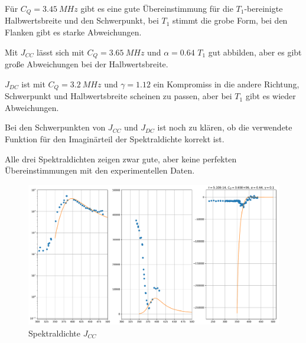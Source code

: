 Für $C_Q = \SI{3.45}{MHz}$ gibt es eine gute Übereinstimmung für die $T_1$-bereinigte Halbwertsbreite und den Schwerpunkt, bei $T_1$ stimmt die grobe Form, bei den Flanken gibt es starke Abweichungen.

Mit $J_{CC}$ lässt sich mit $C_Q = \SI{3.65}{MHz}$ und $\alpha = 0.64$ $T_1$ gut abbilden, aber es gibt große Abweichungen bei der Halbwertsbreite. 

$J_{DC}$ ist mit $C_Q = \SI{3.2}{MHz}$ und $\gamma = 1.12$ ein Kompromiss in die andere Richtung, Schwerpunkt und Halbwertsbreite scheinen zu passen, aber bei $T_1$ gibt es wieder Abweichungen. 

Bei den Schwerpunkten von $J_{CC}$ und $J_{DC}$ ist noch zu klären, ob die verwendete Funktion für den Imaginärteil der Spektraldichte korrekt ist.

Alle drei Spektraldichten zeigen zwar gute, aber keine perfekten Übereinstimmungen mit den experimentellen Daten.



\begin{figure}
	\begin{center}
		\includegraphics[width=\textwidth]{graphics/plots/THEO/J_cc_02.pdf}
	\end{center}
	\caption{Spektraldichte $J_{CC}$} \label{fig:res:theorie_j_cc}
\end{figure}

